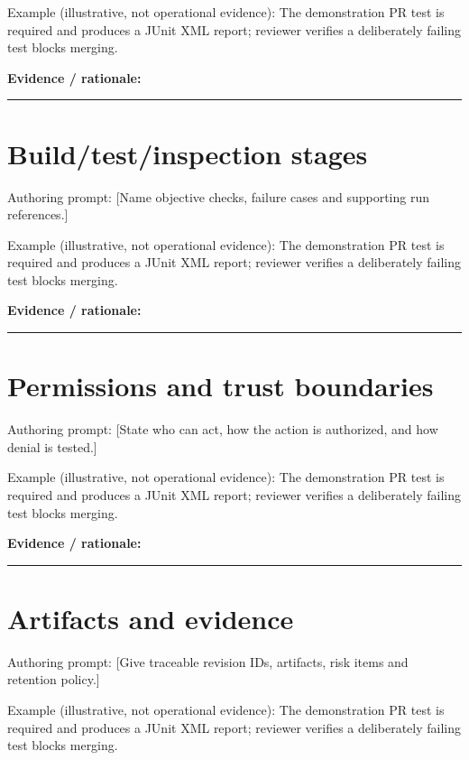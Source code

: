 \documentclass[11pt,letterpaper]{article}
\begin{document}
Example (illustrative, not operational evidence): The demonstration PR test is required and produces a JUnit XML report; reviewer verifies a deliberately failing test blocks merging.

\noindent\textbf{Evidence / rationale:}\par\nobreak\vspace{8pt}\noindent\rule{0.93\linewidth}{0.4pt}\par\vspace{14pt}
\section{Build/test/inspection stages}
Authoring prompt: [Name objective checks, failure cases and supporting run references.]

Example (illustrative, not operational evidence): The demonstration PR test is required and produces a JUnit XML report; reviewer verifies a deliberately failing test blocks merging.

\noindent\textbf{Evidence / rationale:}\par\nobreak\vspace{8pt}\noindent\rule{0.93\linewidth}{0.4pt}\par\vspace{14pt}
\section{Permissions and trust boundaries}
Authoring prompt: [State who can act, how the action is authorized, and how denial is tested.]

Example (illustrative, not operational evidence): The demonstration PR test is required and produces a JUnit XML report; reviewer verifies a deliberately failing test blocks merging.

\noindent\textbf{Evidence / rationale:}\par\nobreak\vspace{8pt}\noindent\rule{0.93\linewidth}{0.4pt}\par\vspace{14pt}
\section{Artifacts and evidence}
Authoring prompt: [Give traceable revision IDs, artifacts, risk items and retention policy.]

Example (illustrative, not operational evidence): The demonstration PR test is required and produces a JUnit XML report; reviewer verifies a deliberately failing test blocks merging.
\end{document}
